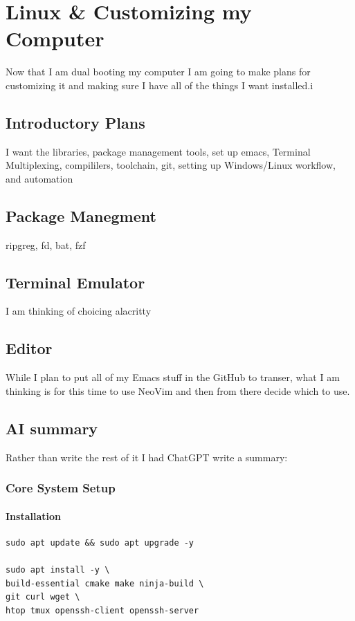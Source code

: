 \chapter{Linux \& Customizing my Computer}
Now that I am dual booting my computer I am going to make plans for customizing it and making sure I have all of the things I want installed.i

\section{Introductory Plans}
I want the libraries, package management tools, set up emacs, Terminal Multiplexing, compililers, toolchain, git, setting up Windows/Linux workflow,
and automation
\section{Package Manegment}
ripgreg, fd, bat, fzf

\section{Terminal Emulator}

I am thinking of choicing alacritty

\section{Editor}
While I plan to put all of my Emacs stuff in the GitHub to transer, what I am thinking
is for this time to use NeoVim and then from there decide which to use.

\section{AI summary}

Rather than write the rest of it I had ChatGPT write a summary:

\subsection{Core System Setup}

\subsubsection{Installation}

\begin{lstlisting}
sudo apt update && sudo apt upgrade -y

sudo apt install -y \
build-essential cmake make ninja-build \
git curl wget \
htop tmux openssh-client openssh-server
\end{lstlisting}

